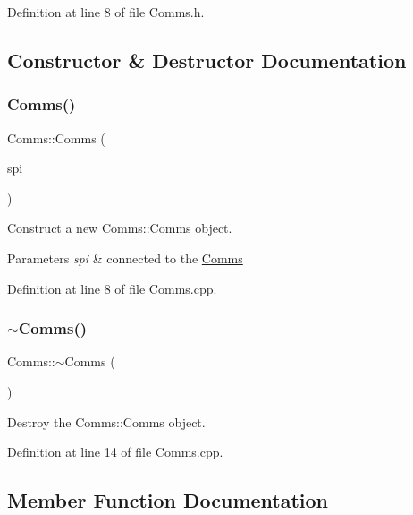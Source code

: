 Definition at line 8 of file Comms.\+h.



\subsection{Constructor \& Destructor Documentation}
\mbox{\label{class_comms_a84e488377d67eaf90750e8dc0c64f947}} 
\subsubsection{\texorpdfstring{Comms()}{Comms()}}
{\footnotesize\ttfamily Comms\+::\+Comms (\begin{DoxyParamCaption}\item[{S\+PI \&}]{spi }\end{DoxyParamCaption})}



Construct a new Comms\+::\+Comms object. 


\begin{DoxyParams}{Parameters}
{\em spi} & connected to the \mbox{\hyperlink{class_comms}{Comms}} \\
\hline
\end{DoxyParams}


Definition at line 8 of file Comms.\+cpp.

\mbox{\label{class_comms_ad18d3a80a82d18d27b0de3b551e4f5fc}} 
\subsubsection{\texorpdfstring{$\sim$Comms()}{~Comms()}}
{\footnotesize\ttfamily Comms\+::$\sim$\+Comms (\begin{DoxyParamCaption}{ }\end{DoxyParamCaption})}



Destroy the Comms\+::\+Comms object. 



Definition at line 14 of file Comms.\+cpp.



\subsection{Member Function Documentation}
\mbox{\label{class_comms_adf638922e6c53bef0fab4f482775f072}} 
